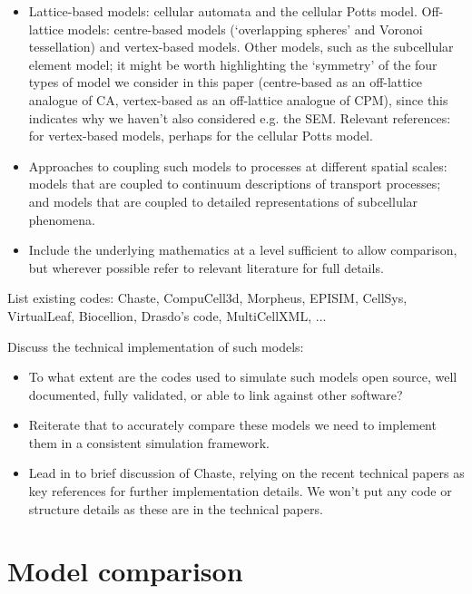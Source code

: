 \documentclass[12pt]{article}
\begin{document}
\begin{itemize}
\item Lattice-based models: cellular automata and the cellular Potts model. Off-lattice models: centre-based models (`overlapping spheres' and Voronoi tessellation) and vertex-based models. Other models, such as the subcellular element model; it might be worth highlighting the `symmetry' of the four types of model we consider in this paper (centre-based as an off-lattice analogue of CA, vertex-based as an off-lattice analogue of CPM), since this indicates why we haven't also considered e.g. the SEM. Relevant references: \citet{Fletcher2013Implementing, Fletcher2014Vertex} for vertex-based models, perhaps \citet{VossBohme2012Mulit-scale} for the cellular Potts model.
\item Approaches to coupling such models to processes at different spatial scales: models that are coupled to continuum descriptions of transport processes; and models that are coupled to detailed representations of subcellular phenomena.
\item Include the underlying mathematics at a level sufficient to allow comparison, but wherever possible refer to relevant literature for full details.
\end{itemize} 

\noindent List existing codes: Chaste, CompuCell3d, Morpheus, EPISIM, CellSys, VirtualLeaf, Biocellion, Drasdo's code, MultiCellXML, ...

\noindent Discuss the technical implementation of such models:
\begin{itemize}
\item To what extent are the codes used to simulate such models open source, well documented, fully validated, or able to link against other software?
\item Reiterate that to accurately compare these models we need to implement them in a consistent simulation framework.
\item Lead in to brief discussion of Chaste, relying on the recent technical papers as key references for further implementation details. We won't put any code or structure details as these are in the technical papers.
\end{itemize}


\section{Model comparison}\label{sec:model_comparison}
\end{document}
